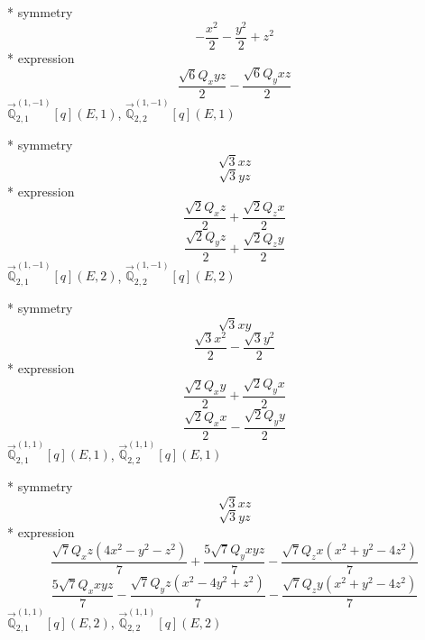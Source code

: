 \documentclass[fleqn,8pt]{jsarticle}
\begin{document}
\noindent\quad ** symmetry
\begin{dmath*}
- \frac{x^{2}}{2} - \frac{y^{2}}{2} + z^{2}
\end{dmath*}
\noindent\quad ** expression
\begin{dmath*}
\frac{\sqrt{6} Q_{x} y z}{2} - \frac{\sqrt{6} Q_{y} x z}{2}
\end{dmath*}
\noindent\quad $\vec{\mathbb{Q}}_{2,1}^{(1,-1)}[q](E,1)$, $\vec{\mathbb{Q}}_{2,2}^{(1,-1)}[q](E,1)$

\noindent\quad ** symmetry
\begin{dmath*}
\sqrt{3} x z
\end{dmath*}
\begin{dmath*}
\sqrt{3} y z
\end{dmath*}
\noindent\quad ** expression
\begin{dmath*}
\frac{\sqrt{2} Q_{x} z}{2} + \frac{\sqrt{2} Q_{z} x}{2}
\end{dmath*}
\begin{dmath*}
\frac{\sqrt{2} Q_{y} z}{2} + \frac{\sqrt{2} Q_{z} y}{2}
\end{dmath*}
\noindent\quad $\vec{\mathbb{Q}}_{2,1}^{(1,-1)}[q](E,2)$, $\vec{\mathbb{Q}}_{2,2}^{(1,-1)}[q](E,2)$

\noindent\quad ** symmetry
\begin{dmath*}
\sqrt{3} x y
\end{dmath*}
\begin{dmath*}
\frac{\sqrt{3} x^{2}}{2} - \frac{\sqrt{3} y^{2}}{2}
\end{dmath*}
\noindent\quad ** expression
\begin{dmath*}
\frac{\sqrt{2} Q_{x} y}{2} + \frac{\sqrt{2} Q_{y} x}{2}
\end{dmath*}
\begin{dmath*}
\frac{\sqrt{2} Q_{x} x}{2} - \frac{\sqrt{2} Q_{y} y}{2}
\end{dmath*}
\noindent\quad $\vec{\mathbb{Q}}_{2,1}^{(1,1)}[q](E,1)$, $\vec{\mathbb{Q}}_{2,2}^{(1,1)}[q](E,1)$

\noindent\quad ** symmetry
\begin{dmath*}
\sqrt{3} x z
\end{dmath*}
\begin{dmath*}
\sqrt{3} y z
\end{dmath*}
\noindent\quad ** expression
\begin{dmath*}
\frac{\sqrt{7} Q_{x} z \left(4 x^{2} - y^{2} - z^{2}\right)}{7} + \frac{5 \sqrt{7} Q_{y} x y z}{7} - \frac{\sqrt{7} Q_{z} x \left(x^{2} + y^{2} - 4 z^{2}\right)}{7}
\end{dmath*}
\begin{dmath*}
\frac{5 \sqrt{7} Q_{x} x y z}{7} - \frac{\sqrt{7} Q_{y} z \left(x^{2} - 4 y^{2} + z^{2}\right)}{7} - \frac{\sqrt{7} Q_{z} y \left(x^{2} + y^{2} - 4 z^{2}\right)}{7}
\end{dmath*}
\noindent\quad $\vec{\mathbb{Q}}_{2,1}^{(1,1)}[q](E,2)$, $\vec{\mathbb{Q}}_{2,2}^{(1,1)}[q](E,2)$
\end{document}
